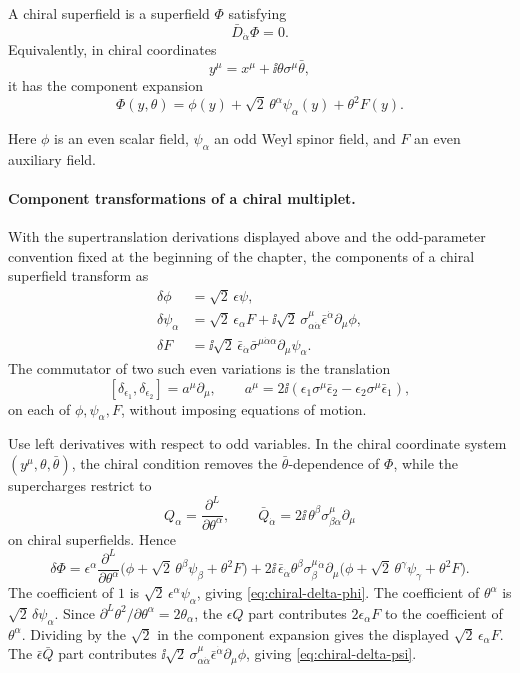 \begin{definition}
\label{def:chiral-superfield}
A chiral superfield is a superfield \(\Phi\) satisfying
\[
  \bar D_{\dot\alpha}\Phi=0 .
\]
Equivalently, in chiral coordinates
\[
  y^\mu=x^\mu+\ii\theta\sigma^\mu\bar\theta,
\]
it has the component expansion
\[
  \Phi(y,\theta)
  =
  \phi(y)+\sqrt2\,\theta^\alpha\psi_\alpha(y)+\theta^2F(y).
\]
\end{definition}

Here \(\phi\) is an even scalar field, \(\psi_\alpha\) an odd Weyl spinor
field, and \(F\) an even auxiliary field.

\paragraph{Component transformations of a chiral multiplet.}
With the supertranslation derivations displayed above and the odd-parameter
convention fixed at the beginning of the chapter, the components of a chiral
superfield transform as
\begin{align}
  \delta\phi&=\sqrt2\,\epsilon\psi,
  \label{eq:chiral-delta-phi}\\
  \delta\psi_\alpha
  &=
  \sqrt2\,\epsilon_\alpha F
  +\ii\sqrt2\,\sigma^\mu_{\alpha\dot\alpha}
  \bar\epsilon^{\dot\alpha}\partial_\mu\phi,
  \label{eq:chiral-delta-psi}\\
  \delta F
  &=
  \ii\sqrt2\,\bar\epsilon_{\dot\alpha}
  \bar\sigma^{\mu\dot\alpha\alpha}\partial_\mu\psi_\alpha .
  \label{eq:chiral-delta-F}
\end{align}
The commutator of two such even variations is the translation
\[
  [\delta_{\epsilon_1},\delta_{\epsilon_2}]
  =
  a^\mu\partial_\mu,
  \qquad
  a^\mu=
  2\ii\left(
  \epsilon_1\sigma^\mu\bar\epsilon_2
  -\epsilon_2\sigma^\mu\bar\epsilon_1
  \right),
\]
on each of \(\phi,\psi_\alpha,F\), without imposing equations of motion.

Use left derivatives with respect to odd variables.  In the chiral coordinate
system \((y^\mu,\theta,\bar\theta)\), the chiral condition removes the
\(\bar\theta\)-dependence of \(\Phi\), while the supercharges restrict to
\[
  Q_\alpha=\frac{\partial^L}{\partial\theta^\alpha},
  \qquad
  \bar Q_{\dot\alpha}
  =
  2\ii\,\theta^\beta\sigma^\mu_{\beta\dot\alpha}\partial_\mu
\]
on chiral superfields.  Hence
\[
  \delta\Phi
  =
  \epsilon^\alpha
  \frac{\partial^L}{\partial\theta^\alpha}
  \bigl(\phi+\sqrt2\,\theta^\beta\psi_\beta+\theta^2F\bigr)
  +
  2\ii\,\bar\epsilon_{\dot\alpha}\theta^\beta
  \sigma^\mu_{\beta}{}^{\dot\alpha}
  \partial_\mu
  \bigl(\phi+\sqrt2\,\theta^\gamma\psi_\gamma+\theta^2F\bigr).
\]
The coefficient of \(1\) is
\(\sqrt2\,\epsilon^\alpha\psi_\alpha\), giving
\eqref{eq:chiral-delta-phi}.  The coefficient of \(\theta^\alpha\) is
\(\sqrt2\,\delta\psi_\alpha\).  Since
\(\partial^L\theta^2/\partial\theta^\alpha=2\theta_\alpha\), the
\(\epsilon Q\) part contributes \(2\epsilon_\alpha F\) to the coefficient of
\(\theta^\alpha\).  Dividing by the \(\sqrt2\) in the component expansion
gives the displayed \(\sqrt2\,\epsilon_\alpha F\).  The
\(\bar\epsilon\bar Q\) part contributes
\(\ii\sqrt2\,\sigma^\mu_{\alpha\dot\alpha}\bar\epsilon^{\dot\alpha}
\partial_\mu\phi\), giving \eqref{eq:chiral-delta-psi}.

